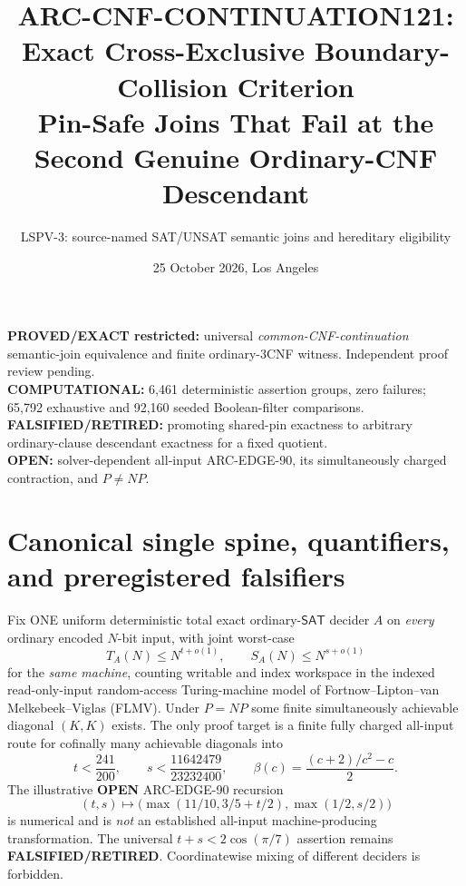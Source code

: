 \documentclass[11pt]{article}
\title{ARC-CNF-CONTINUATION121: Exact Cross-Exclusive Boundary-Collision Criterion\\
\large Pin-Safe Joins That Fail at the Second Genuine Ordinary-CNF Descendant}
\author{LSPV-3: source-named SAT/UNSAT semantic joins and hereditary eligibility}
\date{25 October 2026, Los Angeles}
\newcommand{\SAT}{\mathsf{SAT}}
\begin{document}
\maketitle
\begin{center}
\textbf{PROVED/EXACT restricted:} universal \emph{common-CNF-continuation} semantic-join equivalence and finite ordinary-3CNF witness. Independent proof review pending.\\
\textbf{COMPUTATIONAL:} 6,461 deterministic assertion groups, zero failures; 65,792 exhaustive and 92,160 seeded Boolean-filter comparisons.\\
\textbf{FALSIFIED/RETIRED:} promoting shared-pin exactness to arbitrary ordinary-clause descendant exactness for a fixed quotient.\\
\textbf{OPEN:} solver-dependent all-input ARC-EDGE-90, its simultaneously charged contraction, and $P\ne NP$.
\end{center}

\section{Canonical single spine, quantifiers, and preregistered falsifiers}
Fix ONE uniform deterministic total exact ordinary-$\SAT$ decider $A$ on
\emph{every} ordinary encoded $N$-bit input, with joint worst-case
\[
T_A(N)\le N^{t+o(1)},\qquad
S_A(N)\le N^{s+o(1)}
\]
for the \emph{same machine}, counting writable and index workspace in the indexed
read-only-input random-access Turing-machine model of Fortnow--Lipton--van
Melkebeek--Viglas (FLMV). Under $P=NP$ some finite simultaneously achievable
diagonal $(K,K)$ exists. The only proof target is a finite fully charged all-input
route for cofinally many achievable diagonals into
\[
  t<\frac{241}{200},\qquad
  s<\frac{11642479}{23232400},\qquad
  \beta(c)=\frac{(c+2)/c^2-c}{2}.
\]
The illustrative \textbf{OPEN} ARC-EDGE-90 recursion
\[
(t,s)\longmapsto
\bigl(\max(11/10,3/5+t/2),\max(1/2,s/2)\bigr)
\]
is numerical and is \emph{not} an established all-input machine-producing
transformation. The universal $t+s<2\cos(\pi/7)$ assertion remains
\textbf{FALSIFIED/RETIRED}. Coordinatewise mixing of different deciders is forbidden.
\end{document}
